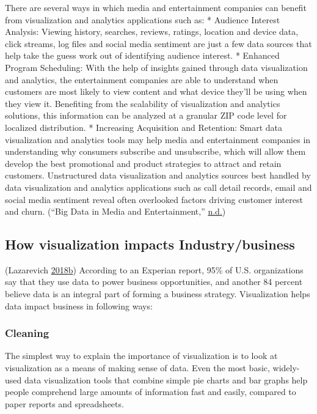 \documentclass[]{book}
\begin{document}
There are several ways in which media and entertainment companies can benefit from visualization and analytics applications such as:
* Audience Interest Analysis: Viewing history, searches, reviews, ratings, location and device data, click streams, log files and social media sentiment are just a few data sources that help take the guess work out of identifying audience interest.
* Enhanced Program Scheduling: With the help of insights gained through data visualization and analytics, the entertainment companies are able to understand when customers are most likely to view content and what device they'll be using when they view it. Benefiting from the scalability of visualization and analytics solutions, this information can be analyzed at a granular ZIP code level for localized distribution.
* Increasing Acquisition and Retention: Smart data visualization and analytics tools may help media and entertainment companies in understanding why consumers subscribe and unsubscribe, which will allow them develop the best promotional and product strategies to attract and retain customers. Unstructured data visualization and analytics sources best handled by data visualization and analytics applications such as call detail records, email and social media sentiment reveal often overlooked factors driving customer interest and churn. (``Big Data in Media and Entertainment,'' \protect\hyperlink{ref-media_entertainment}{n.d.})

\hypertarget{how-visualization-impacts-industrybusiness}{%
\subsection{How visualization impacts Industry/business}\label{how-visualization-impacts-industrybusiness}}

(Lazarevich \protect\hyperlink{ref-biz_strategy}{2018}\protect\hyperlink{ref-biz_strategy}{b})
According to an Experian report, 95\% of U.S. organizations say that they use data to power business opportunities, and another 84 percent believe data is an integral part of forming a business strategy. Visualization helps data impact business in following ways:

\hypertarget{cleaning}{%
\subsubsection{Cleaning}\label{cleaning}}

The simplest way to explain the importance of visualization is to look at visualization as a means of making sense of data. Even the most basic, widely-used data visualization tools that combine simple pie charts and bar graphs help people comprehend large amounts of information fast and easily, compared to paper reports and spreadsheets.
\end{document}
